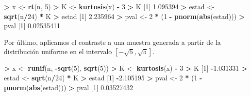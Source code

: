 \documentclass[
  a4paper,
  oneside]{scrbook}
\newenvironment{Shaded}{\begin{snugshade}}{\end{snugshade}}
\newcommand{\DecValTok}[1]{\textcolor[rgb]{0.00,0.00,0.81}{#1}}
\newcommand{\FloatTok}[1]{\textcolor[rgb]{0.00,0.00,0.81}{#1}}
\newcommand{\FunctionTok}[1]{\textcolor[rgb]{0.13,0.29,0.53}{\textbf{#1}}}
\newcommand{\NormalTok}[1]{#1}
\newcommand{\OtherTok}[1]{\textcolor[rgb]{0.56,0.35,0.01}{#1}}
\newcommand{\SpecialCharTok}[1]{\textcolor[rgb]{0.81,0.36,0.00}{\textbf{#1}}}
\theoremstyle{definition}
\theoremstyle{definition}
\theoremstyle{definition}
\theoremstyle{definition}
\theoremstyle{remark}
\begin{document}
\footnotesize

\begin{Shaded}
\begin{Highlighting}[]
\SpecialCharTok{\textgreater{}}\NormalTok{ x }\OtherTok{\textless{}{-}} \FunctionTok{rt}\NormalTok{(n, }\DecValTok{5}\NormalTok{)}
\SpecialCharTok{\textgreater{}}\NormalTok{ K }\OtherTok{\textless{}{-}} \FunctionTok{kurtosis}\NormalTok{(x) }\SpecialCharTok{{-}} \DecValTok{3}
\SpecialCharTok{\textgreater{}}\NormalTok{ K}
\NormalTok{[}\DecValTok{1}\NormalTok{] }\FloatTok{1.095394}
\SpecialCharTok{\textgreater{}}\NormalTok{ estad }\OtherTok{\textless{}{-}} \FunctionTok{sqrt}\NormalTok{(n}\SpecialCharTok{/}\DecValTok{24}\NormalTok{) }\SpecialCharTok{*}\NormalTok{ K}
\SpecialCharTok{\textgreater{}}\NormalTok{ estad}
\NormalTok{[}\DecValTok{1}\NormalTok{] }\FloatTok{2.235964}
\SpecialCharTok{\textgreater{}}\NormalTok{ pval }\OtherTok{\textless{}{-}} \DecValTok{2} \SpecialCharTok{*}\NormalTok{ (}\DecValTok{1} \SpecialCharTok{{-}} \FunctionTok{pnorm}\NormalTok{(}\FunctionTok{abs}\NormalTok{(estad)))}
\SpecialCharTok{\textgreater{}}\NormalTok{ pval}
\NormalTok{[}\DecValTok{1}\NormalTok{] }\FloatTok{0.02535411}
\end{Highlighting}
\end{Shaded}

\normalsize

Por último, aplicamos el contraste a una muestra generada a partir de la
distribución uniforme en el intervalo \(\left[-\sqrt{5},\sqrt{5}\right]\).

\footnotesize

\begin{Shaded}
\begin{Highlighting}[]
\SpecialCharTok{\textgreater{}}\NormalTok{ x }\OtherTok{\textless{}{-}} \FunctionTok{runif}\NormalTok{(n, }\SpecialCharTok{{-}}\FunctionTok{sqrt}\NormalTok{(}\DecValTok{5}\NormalTok{), }\FunctionTok{sqrt}\NormalTok{(}\DecValTok{5}\NormalTok{))}
\SpecialCharTok{\textgreater{}}\NormalTok{ K }\OtherTok{\textless{}{-}} \FunctionTok{kurtosis}\NormalTok{(x) }\SpecialCharTok{{-}} \DecValTok{3}
\SpecialCharTok{\textgreater{}}\NormalTok{ K}
\NormalTok{[}\DecValTok{1}\NormalTok{] }\SpecialCharTok{{-}}\FloatTok{1.031331}
\SpecialCharTok{\textgreater{}}\NormalTok{ estad }\OtherTok{\textless{}{-}} \FunctionTok{sqrt}\NormalTok{(n}\SpecialCharTok{/}\DecValTok{24}\NormalTok{) }\SpecialCharTok{*}\NormalTok{ K}
\SpecialCharTok{\textgreater{}}\NormalTok{ estad}
\NormalTok{[}\DecValTok{1}\NormalTok{] }\SpecialCharTok{{-}}\FloatTok{2.105195}
\SpecialCharTok{\textgreater{}}\NormalTok{ pval }\OtherTok{\textless{}{-}} \DecValTok{2} \SpecialCharTok{*}\NormalTok{ (}\DecValTok{1} \SpecialCharTok{{-}} \FunctionTok{pnorm}\NormalTok{(}\FunctionTok{abs}\NormalTok{(estad)))}
\SpecialCharTok{\textgreater{}}\NormalTok{ pval}
\NormalTok{[}\DecValTok{1}\NormalTok{] }\FloatTok{0.03527432}
\end{Highlighting}
\end{Shaded}
\end{document}
